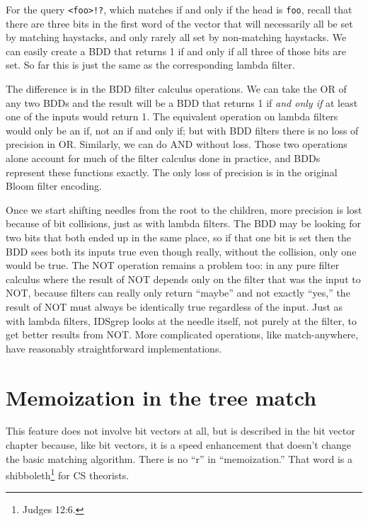 \documentclass[twocolumn]{report}
\newcommand{\DangerousSection}{\marginpar{\large\hfill
\raisebox{-0.5\baselineskip}[0pt][0pt]{\dbend}\hfill\null}}
\begin{document}
For the query \texttt{<foo>!?}, which matches if and only if the head is
\texttt{foo}, recall that there are three bits in the first word of the
vector that will necessarily all be set by matching haystacks, and only rarely
all set by non-matching haystacks.  We can easily create a BDD that
returns 1 if and only if all three of those bits are set.  So far this is
just the same as the corresponding lambda filter.

The difference is in the BDD filter calculus operations.  We can take the OR
of any two BDDs and the result will be a BDD that returns 1 if \emph{and
only if} at least one of the inputs would return 1.  The equivalent
operation on lambda filters would only be an if, not an if and only if; but
with BDD filters there is no loss of precision in OR.  Similarly, we can do
AND without loss.  Those two operations alone account for much of the filter
calculus done in practice, and BDDs represent these functions exactly.  The
only loss of precision is in the original Bloom filter encoding.

Once we start shifting needles from the root to the children, more precision
is lost because of bit collisions, just as with lambda filters.  The BDD may
be looking for two bits that both ended up in the same place, so if that one
bit is set then the BDD sees both its inputs true even though really,
without the collision, only one would be true.  The NOT operation remains a
problem too: in any pure filter calculus where the result of NOT depends
only on the filter that was the input to NOT, because filters can really
only return ``maybe'' and not exactly ``yes,'' the result of NOT must
always be identically true regardless of the input.  Just as with lambda
filters, IDSgrep looks at the needle itself, not purely at the filter, to
get better results from NOT.  More complicated operations, like
match-anywhere, have reasonably straightforward implementations.


\section{Memoization in the tree match}\DangerousSection

This feature does not involve bit vectors at all, but is described in the bit
vector chapter because, like bit vectors, it is a speed enhancement that
doesn't change the basic matching algorithm.  There is no ``r'' in
``memoization.'' That word is a shibboleth\footnote{Judges 12:6.} for CS
theorists.
\end{document}

